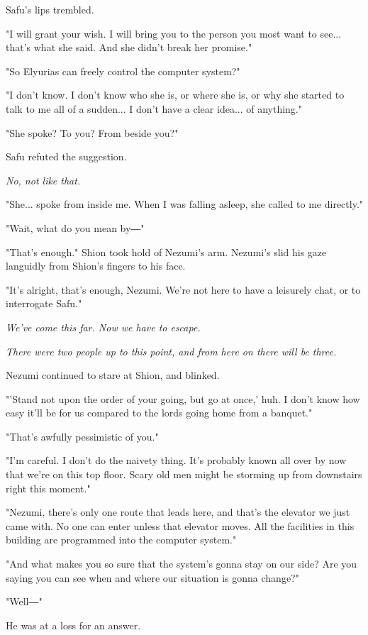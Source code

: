 Safu's lips trembled.

"I will grant your wish. I will bring you to the person you most want to
see... that's what she said. And she didn't break her promise."

"So Elyurias can freely control the computer system?"

"I don't know. I don't know who she is, or where she is, or why she
started to talk to me all of a sudden... I don't have a clear idea... of
anything."

"She spoke? To you? From beside you?"

Safu refuted the suggestion.

\emph{No, not like that.}

"She... spoke from inside me. When I was falling asleep, she called to
me directly."

"Wait, what do you mean by―"

"That's enough." Shion took hold of Nezumi's arm. Nezumi's slid his gaze
languidly from Shion's fingers to his face.

"It's alright, that's enough, Nezumi. We're not here to have a leisurely
chat, or to interrogate Safu."

\emph{We've come this far. Now we have to escape.}

\emph{There were two people up to this point, and from here on there will be
	three.}

Nezumi continued to stare at Shion, and blinked.

"'Stand not upon the order of your going, but go at once,' huh. I
don't know how easy it'll be for us compared to the lords going home
from a banquet."

"That's awfully pessimistic of you."

"I'm careful. I don't do the naivety thing. It's probably known all over
by now that we're on this top floor. Scary old men might be storming up
from downstairs right this moment."

"Nezumi, there's only one route that leads here, and that's the elevator
we just came with. No one can enter unless that elevator moves. All the
facilities in this building are programmed into the computer system."

"And what makes you so sure that the system's gonna stay on our side?
Are you saying you can see when and where our situation is gonna
change?"

"Well―"

He was at a loss for an answer.

